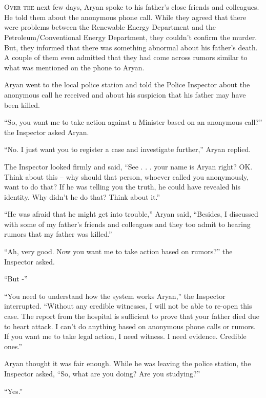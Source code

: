 \chapter{}

\lettrine{O}{ver the} next few days, Aryan spoke to his father's close friends and
colleagues. He told them about the anonymous phone call. While they agreed that
there were problems between the Renewable Energy Department and the
Petroleum/Conventional Energy Department, they couldn't confirm the murder. But,
they informed that there was something abnormal about his father's death. A
couple of them even admitted that they had come across rumors similar to what
was mentioned on the phone to Aryan.

Aryan went to the local police station and told the Police Inspector about the
anonymous call he received and about his suspicion that his father may have been
killed.

“So, you want me to take action against a Minister based on an anonymous call?”
the Inspector asked Aryan.

“No. I just want you to register a case and investigate further,” Aryan replied.

The Inspector looked firmly and said, “See . . . your name is Aryan right? OK.
Think about this – why should that person, whoever called you anonymously, want
to do that? If he was telling you the truth, he could have revealed his
identity. Why didn't he do that? Think about it.”

“He was afraid that he might get into trouble,” Aryan said, “Besides, I
discussed with some of my father's friends and colleagues and they too admit to
hearing rumors that my father was killed.”

“Ah, very good. Now you want me to take action based on rumors?” the Inspector
asked.

“But -”

“You need to understand how the system works Aryan,” the Inspector interrupted.
“Without any credible witnesses, I will not be able to re-open this case. The
report from the hospital is sufficient to prove that your father died due to
heart attack. I can't do anything based on anonymous phone calls or rumors. If
you want me to take legal action, I need witness. I need evidence. Credible
ones.”

Aryan thought it was fair enough. While he was leaving the police station, the
Inspector asked, “So, what are you doing? Are you studying?”

“Yes.”

